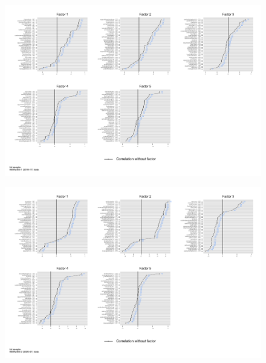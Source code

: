 \documentclass[a4paper, 12pt, onecolumn]{article}
\begin{document}
\begin{figure}[!h]
\raggedright
\includegraphics[scale=0.8]{INPUT/factor2016_tot_without}
\caption{}
\label{fig:diffcastecor}
\end{figure}

\begin{figure}[!h]
\raggedright
\includegraphics[scale=0.8]{INPUT/factor2020_tot_without}
\caption{}
\label{fig:diffcastecor}
\end{figure}




\clearpage
\newpage
%

\end{document}
